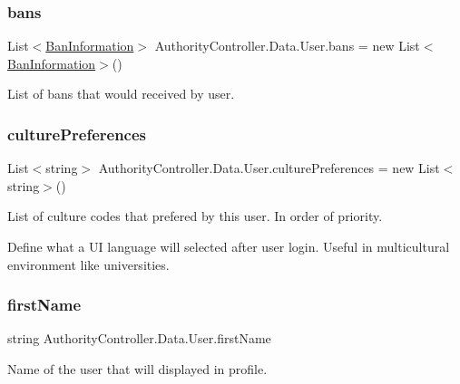 \subsubsection{\texorpdfstring{bans}{bans}}
{\footnotesize\ttfamily List$<$\mbox{\hyperlink{struct_authority_controller_1_1_data_1_1_ban_information}{Ban\+Information}}$>$ Authority\+Controller.\+Data.\+User.\+bans = new List$<$\mbox{\hyperlink{struct_authority_controller_1_1_data_1_1_ban_information}{Ban\+Information}}$>$()}



List of bans that would received by user. 

\mbox{\label{class_authority_controller_1_1_data_1_1_user_a805641f7b51d9399c07f854ce1893def}} 
\subsubsection{\texorpdfstring{culture\+Preferences}{culturePreferences}}
{\footnotesize\ttfamily List$<$string$>$ Authority\+Controller.\+Data.\+User.\+culture\+Preferences = new List$<$string$>$()}



List of culture codes that prefered by this user. In order of priority. 

Define what a UI language will selected after user login. Useful in multicultural environment like universities. \mbox{\label{class_authority_controller_1_1_data_1_1_user_a94a2cbd0dc5fdc315f929c3711d0092b}} 
\subsubsection{\texorpdfstring{first\+Name}{firstName}}
{\footnotesize\ttfamily string Authority\+Controller.\+Data.\+User.\+first\+Name}



Name of the user that will displayed in profile. 

